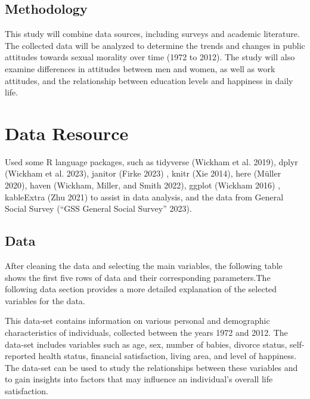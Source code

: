 \documentclass[
  letterpaper,
  DIV=11,
  numbers=noendperiod]{scrartcl}
\begin{document}
\hypertarget{methodology}{%
\subsection{Methodology}\label{methodology}}

This study will combine data sources, including surveys and academic
literature. The collected data will be analyzed to determine the trends
and changes in public attitudes towards sexual morality over time (1972
to 2012). The study will also examine differences in attitudes between
men and women, as well as work attitudes, and the relationship between
education levels and happiness in daily life.

\hypertarget{data-resource}{%
\section{Data Resource}\label{data-resource}}

Used some R language packages, such as tidyverse (Wickham et al. 2019),
dplyr (Wickham et al. 2023), janitor (Firke 2023) , knitr (Xie 2014),
here (Müller 2020), haven (Wickham, Miller, and Smith 2022), ggplot
(Wickham 2016) , kableExtra (Zhu 2021) to assist in data analysis, and
the data from General Social Survey ({``GSS General Social Survey''}
2023).

\hypertarget{sec-data}{%
\subsection{Data}\label{sec-data}}

After cleaning the data and selecting the main variables, the following
table shows the first five rows of data and their corresponding
parameters.The following data section provides a more detailed
explanation of the selected variables for the data.

This data-set contains information on various personal and demographic
characteristics of individuals, collected between the years 1972 and
2012. The data-set includes variables such as age, sex, number of
babies, divorce status, self-reported health status, financial
satisfaction, living area, and level of happiness. The data-set can be
used to study the relationships between these variables and to gain
insights into factors that may influence an individual's overall life
satisfaction.
\end{document}
